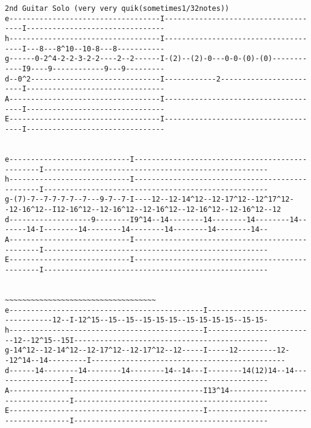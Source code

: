 \begin{verbatim}
2nd Guitar Solo (very very quik(sometimes1/32notes))  
e-----------------------------------I-------------------------------------I--------------------------------
h-----------------------------------I-------------------------------------I---8---8^10--10-8---8-----------
g------0-2^4-2-2-3-2-2----2--2------I-(2)--(2)-0---0-0-(0)-(0)------------I9----9------------9---9---------
d--0^2------------------------------I------------2------------------------I--------------------------------
A-----------------------------------I-------------------------------------I--------------------------------
E-----------------------------------I-------------------------------------I--------------------------------


e----------------------------I------------------------------------------------I----------------------------------------------------
h----------------------------I------------------------------------------------I----------------------------------------------------
g-(7)-7--7-7-7-7--7---9-7--7-I----12--12-14^12--12-17^12--12^17^12--12-16^12--I12-16^12--12-16^12--12-16^12--12-16^12--12-16^12--12
d-------------------9--------I9^14--14--------14--------14--------14-------14-I--------14--------14--------14--------14--------14--
A----------------------------I------------------------------------------------I----------------------------------------------------
E----------------------------I------------------------------------------------I----------------------------------------------------

                                                                                               ~~~~~~~~~~~~~~~~~~~~~~~~~~~~~~~~~~~
e---------------------------------------------I----------------------------------12--I-12^15--15--15--15-15-15--15-15-15-15--15-15-
h---------------------------------------------I-------------------------12--12^15--15I---------------------------------------------
g-14^12--12-14^12--12-17^12--12-17^12--12-----I-----12---------12--12^14--14---------I---------------------------------------------
d------14--------14--------14--------14--14---I--------14(12)14--14------------------I---------------------------------------------
A---------------------------------------------I13^14---------------------------------I---------------------------------------------
E---------------------------------------------I--------------------------------------I---------------------------------------------


\end{verbatim}
